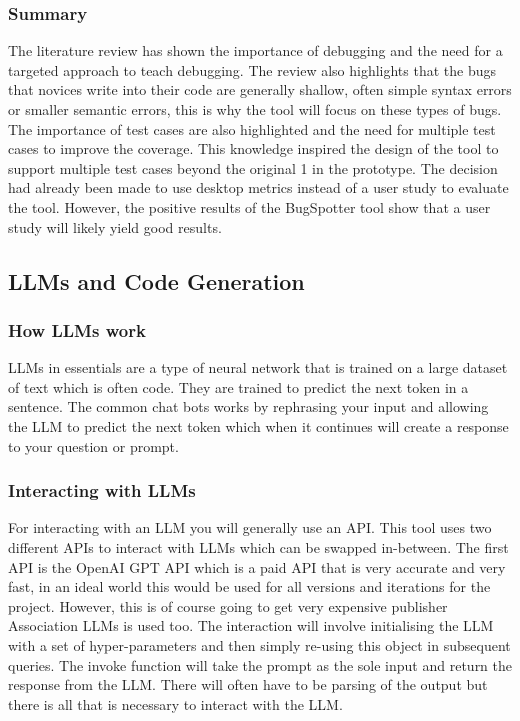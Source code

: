 \documentclass[12pt]{extarticle}
\begin{document}
\subsubsection{Summary}

The literature review has shown the importance of debugging and the need for a targeted approach to teach debugging. The review also highlights that the bugs that novices write into their code are generally shallow, often simple syntax errors or smaller semantic errors, this is why the tool will focus on these types of bugs. The importance of test cases are also highlighted and the need for multiple test cases to improve the coverage. This knowledge inspired the design of the tool to support multiple test cases beyond the original 1 in the prototype. The decision had already been made to use desktop metrics instead of a user study to evaluate the tool. However, the positive results of the BugSpotter tool show that a user study will likely yield good results.

\subsection{LLMs and Code Generation}
\subsubsection{How LLMs work}

LLMs in essentials are a type of neural network that is trained on a large dataset of text which is often code. They are trained to predict the next token in a sentence. The common chat bots works by rephrasing your input and allowing the LLM to predict the next token which when it continues will create a response to your question or prompt.

\subsubsection{Interacting with LLMs}

For interacting with an LLM you will generally use an API. This tool uses two different APIs to interact with LLMs which can be swapped in-between. The first API is the OpenAI GPT API which is a paid API that is very accurate and very fast, in an ideal world this would be used for all versions and iterations for the project. However, this is of course going to get very expensive 
publisher Association  LLMs is used too. The interaction will involve initialising the LLM with a set of hyper-parameters and then simply re-using this object in subsequent queries. The invoke function will take the prompt as the sole input and return the response from the LLM. There will often have to be parsing of the output but there is all that is necessary to interact with the LLM.
\end{document}
